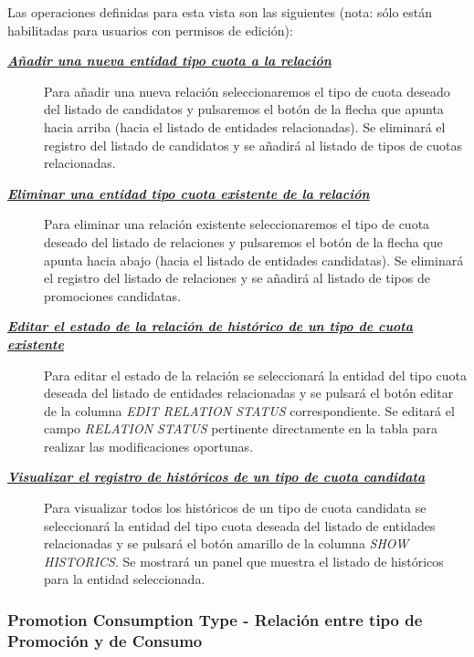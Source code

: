 Las operaciones definidas para esta vista son las siguientes (nota: sólo están habilitadas para usuarios con permisos de edición):
\begin{description}
\item[\underline{\textsl{\textbf{Añadir una nueva entidad tipo cuota a la relación}}}] Para añadir una nueva relación seleccionaremos el tipo de cuota deseado del listado de candidatos y pulsaremos el botón de la flecha que apunta hacia arriba (hacia el listado de entidades relacionadas). Se eliminará el registro del listado de candidatos y se añadirá al listado de tipos de cuotas relacionadas.

\item[\underline{\textsl{\textbf{Eliminar una entidad tipo cuota existente de la relación}}}] Para eliminar una relación existente seleccionaremos el tipo de cuota deseado del listado de relaciones y pulsaremos el botón de la flecha que apunta hacia abajo (hacia el listado de entidades candidatas). Se eliminará el registro del listado de relaciones y se añadirá al listado de tipos de promociones candidatas.

\item[\underline{\textsl{\textbf{Editar el estado de la relación de histórico de un tipo de cuota existente}}}] Para editar el estado de la relación se seleccionará la entidad del tipo cuota  deseada del listado de entidades relacionadas y se pulsará el botón editar de la columna \textit{EDIT RELATION STATUS} correspondiente. Se editará el campo \emph{RELATION STATUS} pertinente directamente en la tabla para realizar las modificaciones oportunas.

\item[\underline{\textsl{\textbf{Visualizar el registro de históricos de un tipo de cuota candidata}}}] Para visualizar todos los históricos de un tipo de cuota candidata se seleccionará la entidad del tipo cuota deseada del listado de entidades relacionadas y se pulsará el botón amarillo de la columna \textit{SHOW HISTORICS}. Se mostrará un panel que muestra el listado de históricos para la entidad seleccionada. 
\end{description}



\subsubsection{Promotion Consumption Type - Relación entre tipo de Promoción y de Consumo}
\label{sub:promotion-consumption-type-relation}

